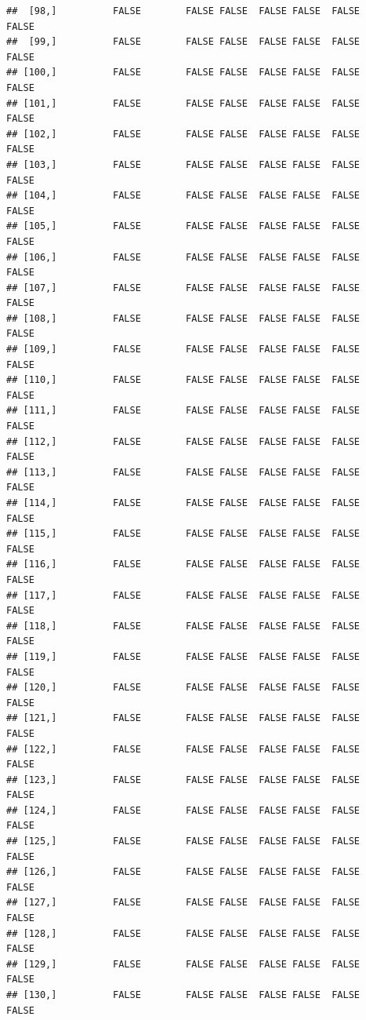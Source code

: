 \documentclass[
  english,
  man,floatsintext]{apa6}
\begin{document}
\begin{verbatim}
##  [98,]          FALSE        FALSE FALSE  FALSE FALSE  FALSE            FALSE
##  [99,]          FALSE        FALSE FALSE  FALSE FALSE  FALSE            FALSE
## [100,]          FALSE        FALSE FALSE  FALSE FALSE  FALSE            FALSE
## [101,]          FALSE        FALSE FALSE  FALSE FALSE  FALSE            FALSE
## [102,]          FALSE        FALSE FALSE  FALSE FALSE  FALSE            FALSE
## [103,]          FALSE        FALSE FALSE  FALSE FALSE  FALSE            FALSE
## [104,]          FALSE        FALSE FALSE  FALSE FALSE  FALSE            FALSE
## [105,]          FALSE        FALSE FALSE  FALSE FALSE  FALSE            FALSE
## [106,]          FALSE        FALSE FALSE  FALSE FALSE  FALSE            FALSE
## [107,]          FALSE        FALSE FALSE  FALSE FALSE  FALSE            FALSE
## [108,]          FALSE        FALSE FALSE  FALSE FALSE  FALSE            FALSE
## [109,]          FALSE        FALSE FALSE  FALSE FALSE  FALSE            FALSE
## [110,]          FALSE        FALSE FALSE  FALSE FALSE  FALSE            FALSE
## [111,]          FALSE        FALSE FALSE  FALSE FALSE  FALSE            FALSE
## [112,]          FALSE        FALSE FALSE  FALSE FALSE  FALSE            FALSE
## [113,]          FALSE        FALSE FALSE  FALSE FALSE  FALSE            FALSE
## [114,]          FALSE        FALSE FALSE  FALSE FALSE  FALSE            FALSE
## [115,]          FALSE        FALSE FALSE  FALSE FALSE  FALSE            FALSE
## [116,]          FALSE        FALSE FALSE  FALSE FALSE  FALSE            FALSE
## [117,]          FALSE        FALSE FALSE  FALSE FALSE  FALSE            FALSE
## [118,]          FALSE        FALSE FALSE  FALSE FALSE  FALSE            FALSE
## [119,]          FALSE        FALSE FALSE  FALSE FALSE  FALSE            FALSE
## [120,]          FALSE        FALSE FALSE  FALSE FALSE  FALSE            FALSE
## [121,]          FALSE        FALSE FALSE  FALSE FALSE  FALSE            FALSE
## [122,]          FALSE        FALSE FALSE  FALSE FALSE  FALSE            FALSE
## [123,]          FALSE        FALSE FALSE  FALSE FALSE  FALSE            FALSE
## [124,]          FALSE        FALSE FALSE  FALSE FALSE  FALSE            FALSE
## [125,]          FALSE        FALSE FALSE  FALSE FALSE  FALSE            FALSE
## [126,]          FALSE        FALSE FALSE  FALSE FALSE  FALSE            FALSE
## [127,]          FALSE        FALSE FALSE  FALSE FALSE  FALSE            FALSE
## [128,]          FALSE        FALSE FALSE  FALSE FALSE  FALSE            FALSE
## [129,]          FALSE        FALSE FALSE  FALSE FALSE  FALSE            FALSE
## [130,]          FALSE        FALSE FALSE  FALSE FALSE  FALSE            FALSE

\end{verbatim}
\end{document}
